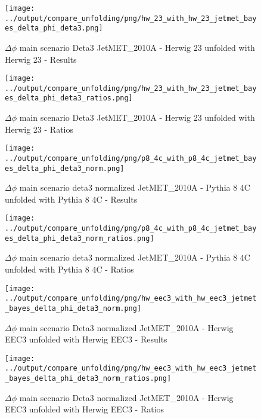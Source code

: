 \documentclass[11pt]{book}
\begin{document}
\begin{figure}[ht]
\centering
\texttt{[image: ../output/compare\_unfolding/png/hw\_23\_with\_hw\_23\_jetmet\_bayes\_delta\_phi\_deta3.png]}
\caption{$\Delta\phi$ main scenario Deta3 JetMET\_2010A - Herwig 23 unfolded with Herwig 23 - Results}
\label{hw_23_hw_23_jetmet_bayes_delta_phi_deta3_a}
\end{figure}

\begin{figure}[ht]
\centering
\texttt{[image: ../output/compare\_unfolding/png/hw\_23\_with\_hw\_23\_jetmet\_bayes\_delta\_phi\_deta3\_ratios.png]}
\caption{$\Delta\phi$ main scenario Deta3 JetMET\_2010A - Herwig 23 unfolded with Herwig 23 - Ratios}
\label{hw_23_hw_23_jetmet_bayes_delta_phi_deta3_b}
\end{figure}


\begin{figure}[ht]
\centering
\texttt{[image: ../output/compare\_unfolding/png/p8\_4c\_with\_p8\_4c\_jetmet\_bayes\_delta\_phi\_deta3\_norm.png]}
\caption{$\Delta\phi$ main scenario deta3 normalized JetMET\_2010A - Pythia 8 4C unfolded with Pythia 8 4C - Results}
\label{p8_p8_jetmet_bayes_delta_phi_deta3_norm_a}
\end{figure}

\begin{figure}[ht]
\centering
\texttt{[image: ../output/compare\_unfolding/png/p8\_4c\_with\_p8\_4c\_jetmet\_bayes\_delta\_phi\_deta3\_norm\_ratios.png]}
\caption{$\Delta\phi$ main scenario deta3 normalized JetMET\_2010A - Pythia 8 4C unfolded with Pythia 8 4C - Ratios}
\label{p8_p8_jetmet_bayes_delta_phi_deta3_norm_b}
\end{figure}

\begin{figure}[ht]
\centering
\texttt{[image: ../output/compare\_unfolding/png/hw\_eec3\_with\_hw\_eec3\_jetmet\_bayes\_delta\_phi\_deta3\_norm.png]}
\caption{$\Delta\phi$ main scenario Deta3 normalized JetMET\_2010A - Herwig EEC3 unfolded with Herwig EEC3 - Results}
\label{hw_eec3_hw_eec3_jetmet_bayes_delta_phi_deta3_norm_a}
\end{figure}

\begin{figure}[ht]
\centering
\texttt{[image: ../output/compare\_unfolding/png/hw\_eec3\_with\_hw\_eec3\_jetmet\_bayes\_delta\_phi\_deta3\_norm\_ratios.png]}
\caption{$\Delta\phi$ main scenario Deta3 normalized JetMET\_2010A - Herwig EEC3 unfolded with Herwig EEC3 - Ratios}
\label{hw_eec3_hw_eec3_jetmet_bayes_delta_phi_deta3_norm_b}
\end{figure}
\end{document}
